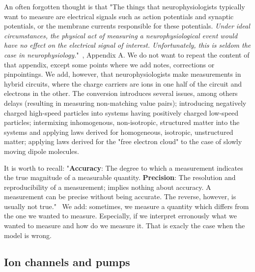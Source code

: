 An often forgotten thought is that
"The things that neurophysiologists typically want to measure
are electrical signals such as action potentials and synaptic potentials,
or the membrane currents responsible for these potentials. \textit{Under ideal
circumstances, the physical act of measuring a neurophysiological event
would have no effect on the electrical signal of interest. Unfortunately,
this is seldom the case in neurophysiology.}"~\cite{JohnstonWuNeurophysiology:1995}, Appendix A. We do not want to repeat the content of that appendix, except some
points where we add notes, corrections or pinpointings.
We add, however, that neurophysiologists make measurements in
hybrid circuits, where the charge carriers are ions in one half of the circuit and electrons in the other. The conversion introduces several issues, among others delays (resulting 
in measuring non-matching value  pairs); introducing negatively
charged high-speed particles into systems having positively charged low-speed particles; intermixing inhomogenous, non-isotropic, structured matter into the systems and applying laws
derived for homogeneous, isotropic, unstructured matter; applying laws derived for the "free electron cloud" to the case of slowly moving dipole molecules.

It is worth to recall: "\textbf{Accuracy}: The degree to which a measurement indicates the true magnitude of a measurable quantity. \textbf{Precision}: The resolution and reproducibility of a measurement; implies nothing about accuracy. A measurement can be precise without being accurate. The reverse, however, is usually not true."~\cite{JohnstonWuNeurophysiology:1995} We add: sometimes, we measure a quantity which differs from the one we wanted to measure. Especially, if we interpret erronously what we wanted to measure and how do we measure it. That is exacly the case when the model is wrong.


\subsection{Ion channels and pumps\label{sec:Physics-IonChannels}\label{sec:Physics-ResourcesIonChannels}}


